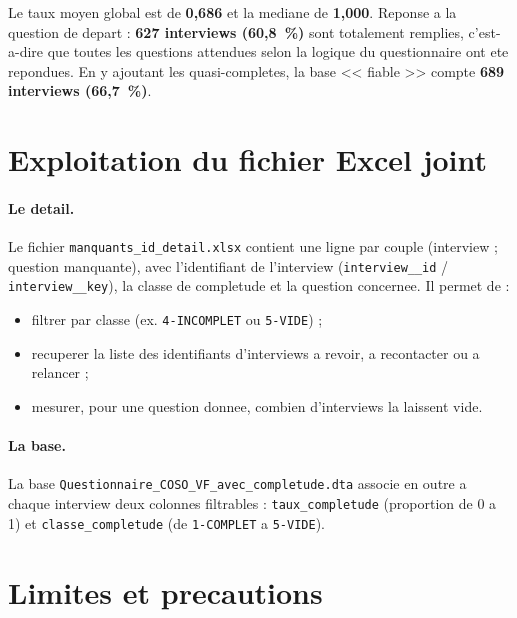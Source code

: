 \documentclass[11pt,a4paper]{article}
\begin{document}
Le taux moyen global est de \textbf{0,686} et la mediane de \textbf{1,000}.
Reponse a la question de depart : \textbf{627 interviews (60,8~\%)} sont
totalement remplies, c'est-a-dire que toutes les questions attendues selon
la logique du questionnaire ont ete repondues. En y ajoutant les
quasi-completes, la base << fiable >> compte \textbf{689 interviews
(66,7~\%)}.

\section{Exploitation du fichier Excel joint}

\paragraph{Le detail.}
Le fichier \texttt{manquants\_id\_detail.xlsx} contient une ligne par couple
(interview ; question manquante), avec l'identifiant de l'interview
(\texttt{interview\_\_id} / \texttt{interview\_\_key}), la classe de
completude et la question concernee. Il permet de :
\begin{itemize}
  \item filtrer par classe (ex. \texttt{4-INCOMPLET} ou \texttt{5-VIDE}) ;
  \item recuperer la liste des identifiants d'interviews a revoir, a
        recontacter ou a relancer ;
  \item mesurer, pour une question donnee, combien d'interviews la laissent
        vide.
\end{itemize}

\paragraph{La base.}
La base \texttt{Questionnaire\_COSO\_VF\_avec\_completude.dta} associe en
outre a chaque interview deux colonnes filtrables :
\texttt{taux\_completude} (proportion de 0 a 1) et
\texttt{classe\_completude} (de \texttt{1-COMPLET} a \texttt{5-VIDE}).

\section{Limites et precautions}
\end{document}
